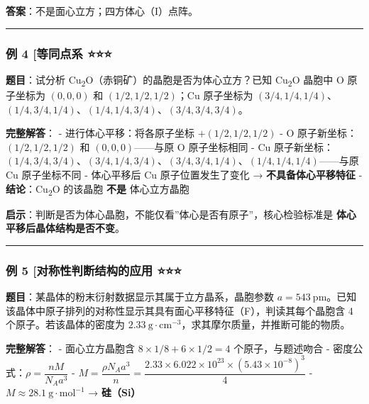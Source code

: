 \documentclass[a4paper,11pt]{ctexart}
\begin{document}
\textbf{答案}：不是面心立方；四方体心（I）点阵。

\begin{center}\rule{0.5\linewidth}{0.5pt}\end{center}

\subsubsection{例 4 {[}等同点系 ⭐⭐⭐}\label{ux4f8b-4-ux7b49ux540cux70b9ux7cfb}

\textbf{题目}：试分析 Cu\textsubscript{2}O（赤铜矿）的晶胞是否为体心立方？已知 Cu\textsubscript{2}O 晶胞中 O 原子坐标为 \((0, 0, 0)\) 和 \((1/2, 1/2, 1/2)\)；Cu 原子坐标为 \((3/4, 1/4, 1/4)\)、\((1/4, 3/4, 1/4)\)、\((1/4, 1/4, 3/4)\)、\((3/4, 3/4, 3/4)\)。

\textbf{完整解答}：
- 进行体心平移：将各原子坐标 \(+(1/2, 1/2, 1/2)\)
- O 原子新坐标：\((1/2, 1/2, 1/2)\) 和 \((0, 0, 0)\)------与原 O 原子坐标相同
- Cu 原子新坐标：\((1/4, 3/4, 3/4)\)、\((3/4, 1/4, 3/4)\)、\((3/4, 3/4, 1/4)\)、\((1/4, 1/4, 1/4)\)------与原 Cu 原子坐标不同
- 体心平移后 Cu 原子位置发生了变化 → \textbf{不具备体心平移特征}
- \textbf{结论}：Cu\textsubscript{2}O 的该晶胞 \textbf{不是} 体心立方晶胞

\textbf{启示}：判断是否为体心晶胞，不能仅看''体心是否有原子''，核心检验标准是 \textbf{体心平移后晶体结构是否不变}。

\begin{center}\rule{0.5\linewidth}{0.5pt}\end{center}

\subsubsection{例 5 {[}对称性判断结构的应用 ⭐⭐⭐}\label{ux4f8b-5-ux5bf9ux79f0ux6027ux5224ux65adux7ed3ux6784ux7684ux5e94ux7528}

\textbf{题目}：某晶体的粉末衍射数据显示其属于立方晶系，晶胞参数 \(a = 543\ \mathrm{pm}\)。已知该晶体中原子排列的对称性显示其具有面心平移特征（F），判读其每个晶胞含 4 个原子。若该晶体的密度为 \(2.33\ \mathrm{g\cdot cm^{-3}}\)，求其摩尔质量，并推断可能的物质。

\textbf{完整解答}：
- 面心立方晶胞含 \(8 \times 1/8 + 6 \times 1/2 = 4\) 个原子，与题述吻合
- 密度公式：\(\rho = \dfrac{nM}{N_A a^3}\)
- \(M = \dfrac{\rho N_A a^3}{n} = \dfrac{2.33 \times 6.022\times 10^{23} \times (5.43\times 10^{-8})^3}{4}\)
- \(M \approx 28.1\ \mathrm{g\cdot mol^{-1}}\) → \textbf{硅（Si）}
\end{document}
